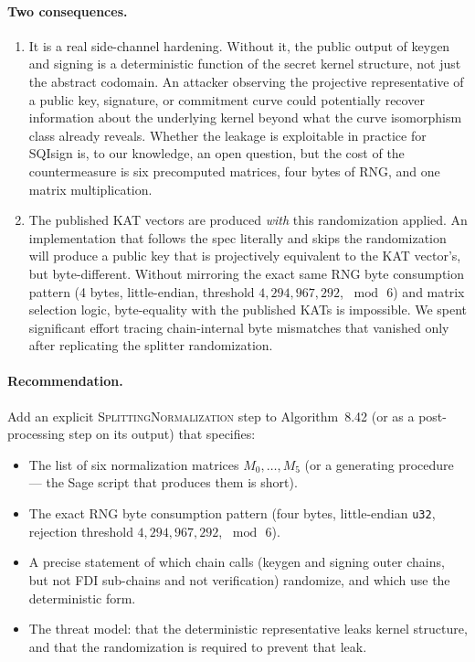 \documentclass[a4paper,11pt]{article}
\newcommand{\algo}[1]{Algorithm~#1}
\begin{document}
\paragraph{Two consequences.}

\begin{enumerate}

\item It is a real side-channel hardening.  Without it, the public
  output of keygen and signing is a deterministic function of the
  secret kernel structure, not just the abstract codomain.  An
  attacker observing the projective representative of a public
  key, signature, or commitment curve could potentially recover
  information about the underlying kernel beyond what the curve
  isomorphism class already reveals.  Whether the leakage is
  exploitable in practice for SQIsign is, to our knowledge, an
  open question, but the cost of the countermeasure is six
  precomputed matrices, four bytes of RNG, and one matrix
  multiplication.

\item The published KAT vectors are produced \emph{with} this
  randomization applied.  An implementation that follows the spec
  literally and skips the randomization will produce a public key
  that is projectively equivalent to the KAT vector's, but
  byte-different.  Without mirroring the exact same RNG byte
  consumption pattern (4 bytes, little-endian, threshold
  $4{,}294{,}967{,}292$, $\bmod\,6$) and matrix selection logic,
  byte-equality with the published KATs is impossible.  We spent
  significant effort tracing chain-internal byte mismatches that
  vanished only after replicating the splitter randomization.

\end{enumerate}

\paragraph{Recommendation.}
Add an explicit \textsc{SplittingNormalization} step to
\algo{8.42} (or as a post-processing step on its output) that
specifies:

\begin{itemize}
\item The list of six normalization matrices $M_0, \dots, M_5$
  (or a generating procedure --- the Sage script that produces
  them is short).
\item The exact RNG byte consumption pattern (four bytes,
  little-endian \texttt{u32}, rejection threshold
  $4{,}294{,}967{,}292$, $\bmod\,6$).
\item A precise statement of which chain calls (keygen and
  signing outer chains, but not FDI sub-chains and not
  verification) randomize, and which use the deterministic form.
\item The threat model: that the deterministic representative
  leaks kernel structure, and that the randomization is required
  to prevent that leak.
\end{itemize}
\end{document}
